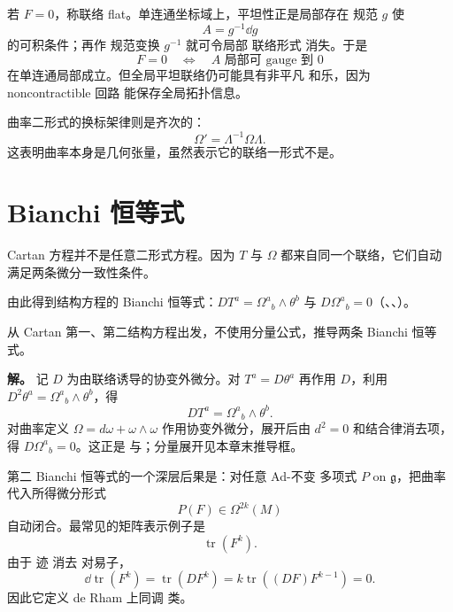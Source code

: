 若 $F=0$，称联络 flat。单连通坐标域上，平坦性正是局部存在 规范 $g$ 使
\begin{equation*}A=g^{-1}\dd g\end{equation*}
的可积条件；再作 规范变换 $g^{-1}$ 就可令局部 联络形式 消失。于是
\[
F=0
\quad\Longleftrightarrow\quad
A\text{ 局部可 gauge 到 }0
\]
在单连通局部成立。但全局平坦联络仍可能具有非平凡 和乐，因为 noncontractible 回路 能保存全局拓扑信息。

曲率二形式的换标架律则是齐次的：
\begin{equation*}\Omega'=\Lambda^{-1}\Omega\Lambda.
\end{equation*}
这表明曲率本身是几何张量，虽然表示它的联络一形式不是。

\section{Bianchi 恒等式}
Cartan 方程并不是任意二形式方程。因为 $T$ 与 $\Omega$ 都来自同一个联络，它们自动满足两条微分一致性条件。

由此得到结构方程的 Bianchi 恒等式：$DT^a=\Omega^a{}_b\wedge\theta^b$ 与 $D\Omega^a{}_b=0$（、、）。

\par
\begin{workedexample}
从 Cartan 第一、第二结构方程出发，不使用分量公式，推导两条 Bianchi 恒等式。

\textbf{解。} 记 \(D\) 为由联络诱导的协变外微分。对 \(T^a=D\theta^a\) 再作用 \(D\)，利用 \(D^2\theta^a=\Omega^a{}_b\wedge\theta^b\)，得
\[
DT^a=\Omega^a{}_b\wedge\theta^b.
\]
对曲率定义 \(\Omega=d\omega+\omega\wedge\omega\) 作用协变外微分，展开后由 \(d^2=0\) 和结合律消去项，得 \(D\Omega^a{}_b=0\)。这正是 与；分量展开见本章末推导框。
\end{workedexample}
\par


第二 Bianchi 恒等式的一个深层后果是：对任意 Ad-不变 多项式 $P$ on $\mathfrak g$，把曲率代入所得微分形式
\begin{equation*}P(F)\in\Omega^{2k}(M)\end{equation*}
自动闭合。最常见的矩阵表示例子是
\[
\operatorname{tr}(F^k).
\]
由于 迹 消去 对易子，
\[
\dd\operatorname{tr}(F^k)
=\operatorname{tr}(D F^k)
=k\operatorname{tr}((DF)F^{k-1})=0.
\]
因此它定义 de Rham 上同调 类。

